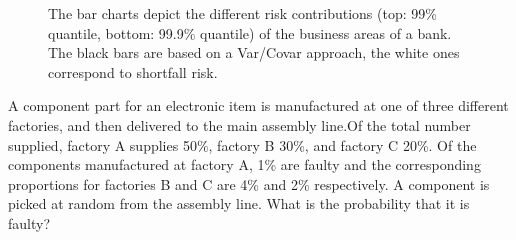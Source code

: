 \documentclass{book}
\begin{document}
\begin{figure}[htb]
\begin{center}
\end{center}
\caption[The bar charts depict the different risk contributions]{The bar charts depict the different risk contributions (top: 99\% quantile, bottom: 99.9\% quantile) of the business areas of a bank. The black bars
are based on a Var/Covar approach, the white ones correspond to shortfall risk.}
\end{figure}


A component part for an electronic item is
manufactured at one of three different factories, and then delivered to
the main assembly line.Of the total number supplied, factory A supplies
50\%, factory B 30\%, and factory C 20\%. Of the components
manufactured at factory A, 1\% are faulty and the corresponding
proportions for factories B and C are 4\% and 2\% respectively. A
component is picked at random from the assembly line. What is the
probability that it is faulty? 
\end{document}
